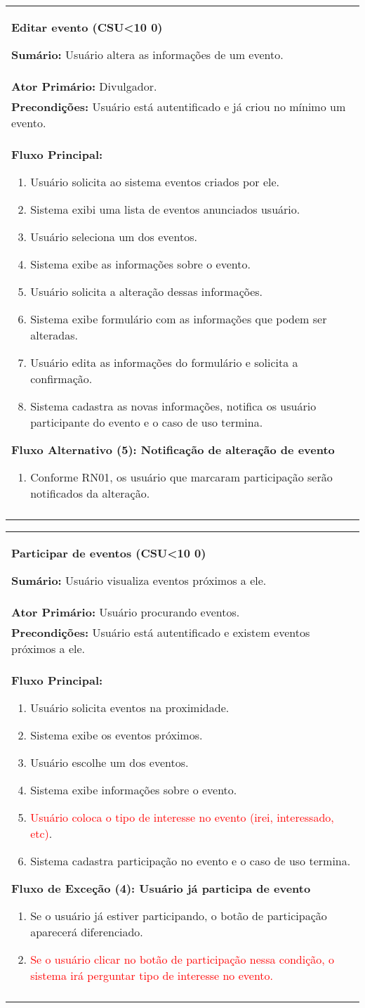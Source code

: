 \documentclass{article}
\newcounter{cscounter}
\newcommand{\sumario}[1] {\textbf{Sumário:} #1\\ }
\newcommand{\ator}[1] {\textbf{Ator Primário:} #1\\}
\newcommand{\precond}[1] {\textbf{Precondições:} #1\\}
\newcommand{\fluxo}{\textbf{Fluxo Principal:}}
\newenvironment{fluxoa}[2]
	{
		\textbf{Fluxo Alternativo (#1): #2}
		\begin{enumerate}[itemsep=0mm, label=(\alph*)]			
	}
	{
		\end{enumerate}			
	}
\newenvironment{fluxoe}[2]
	{
		\textbf{Fluxo de Exceção (#1): #2}
		\begin{enumerate}[itemsep=0mm, label=(\alph*)]			
	}
	{
		\end{enumerate}			
	}
\newenvironment{casosdeuso}[1]
{
 \stepcounter{cscounter}
 \begin{center}
 \begin{tabular}{|p{\textwidth}|}
 \hline
 \begin{center}
 \large \textbf{#1 (CSU\ifnum\value{cscounter}<10 0\fi\arabic{cscounter})}
 \end{center}
}
{ 
 \\\\\hline
 \end{tabular} 
 \end{center}
}
\begin{document}
\begin{casosdeuso}{Editar evento}
 \sumario{Usuário altera as informações de um evento.}
 \ator{Divulgador.}
 \precond{Usuário está autentificado e já criou no mínimo um evento.}
\fluxo
\begin{enumerate}[itemsep=0mm]
 \item Usuário solicita ao sistema eventos criados por ele.
 \item Sistema exibi uma lista de eventos anunciados usuário.
 \item Usuário seleciona um dos eventos.
 \item Sistema exibe as informações sobre o evento.
 \item Usuário solicita a alteração dessas informações.
 \item Sistema exibe formulário com as informações que podem ser alteradas.
 \item Usuário edita as informações do formulário e solicita a confirmação.
 \item Sistema cadastra as novas informações, notifica os usuário participante do evento e o caso de uso termina.
\end{enumerate}
\begin{fluxoa}{5}{Notificação de alteração de evento}
 \item Conforme RN01, os usuário que marcaram participação serão notificados da alteração.
\end{fluxoa}
\end{casosdeuso}


\begin{casosdeuso}{Participar de  eventos}
 \sumario{Usuário visualiza eventos próximos a ele.}
 \ator{Usuário procurando eventos.}
 \precond{Usuário está autentificado e existem eventos próximos a ele.}
\fluxo
\begin{enumerate}[itemsep=0mm]
 \item Usuário solicita eventos na proximidade.
 \item Sistema exibe os eventos próximos.
 \item Usuário escolhe um dos eventos.
 \item Sistema exibe informações sobre o evento.
 \item{\textcolor{red}{Usuário coloca o tipo de interesse no evento (irei, interessado, etc)}.}
 \item Sistema cadastra participação no evento e o caso de uso termina.
 \end{enumerate}
 \begin{fluxoe}{4}{Usuário já participa de evento}
 \item Se o usuário já estiver participando, o botão de participação aparecerá diferenciado.
 \item{\textcolor{red}{Se o usuário clicar no botão de participação nessa condição, o sistema irá perguntar tipo de interesse no evento.}}
 \end{fluxoe} 
\end{casosdeuso}
\end{document}
